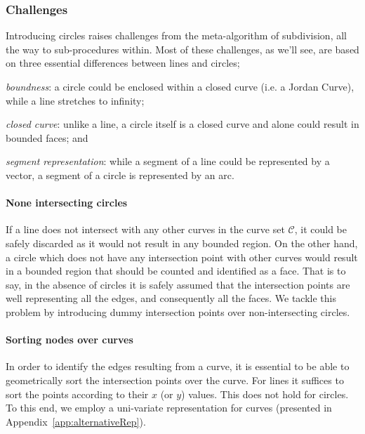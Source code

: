 \subsubsection{Challenges}

Introducing circles raises challenges from the meta-algorithm of subdivision, all the way to sub-procedures within.
Most of these challenges, as we'll see, are based on three essential differences between lines and circles;
\begin{inparaenum}
  \item \emph{boundness}: a circle could be enclosed within a closed curve (i.e. a Jordan Curve), while a line stretches to infinity;
  \item \emph{closed curve}: unlike a line, a circle itself is a closed curve and alone could result in bounded faces; and 
  \item \emph{segment representation}: while a segment of a line could be represented by a vector, a segment of a circle is represented by an arc.
\end{inparaenum}


\paragraph{None intersecting circles}
If a line does not intersect with any other curves in the curve set $\mathcal{C}$, it could be safely discarded as it would not result in any bounded region.
On the other hand, a circle which does not have any intersection point with other curves would result in a bounded region that should be counted and identified as a face.
That is to say, in the absence of circles it is safely assumed that the intersection points are well representing all the edges, and consequently all the faces.
We tackle this problem by introducing dummy intersection points over non-intersecting circles.

\paragraph{Sorting nodes over curves}
In order to identify the edges resulting from a curve, it is essential to be able to geometrically sort the intersection points over the curve.
For lines it suffices to sort the points according to their $x$ (or $y$) values.
This does not hold for circles.
To this end, we employ a uni-variate representation for curves (presented in Appendix~\ref{app:alternativeRep}).

